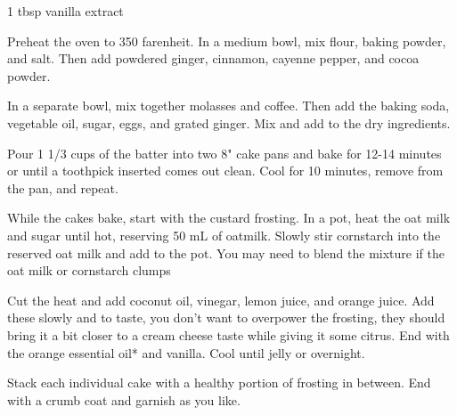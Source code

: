\documentclass[12 pt, twoside]{amsart}
\begin{document}
{\begin{ingredients}
\item 1 tbsp vanilla extract
\end{ingredients}
}{
\begin{directions}
\item Preheat the oven to 350 farenheit. In a medium bowl, mix flour, baking powder, and salt. Then add powdered ginger, cinnamon, %
cayenne pepper, and cocoa powder.
\item In a separate bowl, mix together molasses and coffee. Then add the baking soda, vegetable oil, sugar, eggs, and grated ginger. Mix and add to the dry ingredients. 
\item Pour 1 1/3 cups of the batter into two 8" cake pans and bake for 12-14 minutes or until a toothpick inserted comes out clean. Cool for 10 minutes, remove from the pan, and repeat.
\item While the cakes bake, start with the custard frosting. In a pot, heat the oat milk and sugar until hot, reserving 50 mL of oatmilk. Slowly stir cornstarch into the reserved oat milk and add to the pot. You may need to blend the mixture if the oat milk or cornstarch clumps
\item Cut the heat and add coconut oil, vinegar, lemon juice, and orange juice. Add these slowly and to taste, you don't want to overpower the frosting, they should bring it a bit closer to a cream cheese taste while giving it some citrus. End with the orange essential oil* and vanilla. Cool until jelly or overnight.
\item Stack each individual cake with a healthy portion of frosting in between. End with a crumb coat and garnish as you like.
\end{directions}
}
\end{document}
